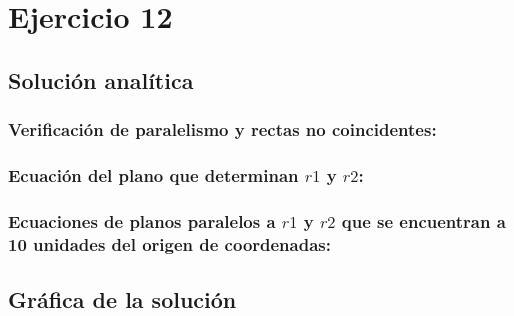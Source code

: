 \newpage
\clearpage

\section{Ejercicio 12}



\newpage
\subsection{Solución analítica}



\newpage
\subsubsection{Verificación de paralelismo y rectas no coincidentes:}


\newpage
\subsubsection{Ecuación del plano que determinan $r1$ y $r2$:}


\newpage
\subsubsection{Ecuaciones de planos paralelos a $r1$ y $r2$ que se encuentran a 10 unidades del origen de coordenadas:}


\newpage
\subsection{Gráfica de la solución}
